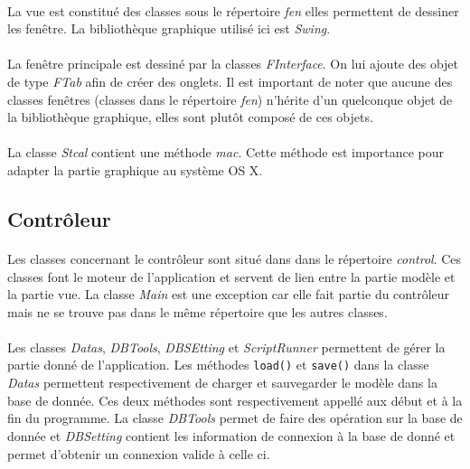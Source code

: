 \documentclass[a4paper,10pt]{report}
\begin{document}
			\paragraph*{}
			La vue est constitué des classes sous le répertoire \textit{fen} elles permettent de dessiner les fenêtre. La bibliothèque graphique utilisé ici est \textit{Swing}.

			\paragraph*{}
			La fenêtre principale est dessiné par la classes \textit{FInterface}. On lui ajoute des objet de type \textit{FTab} afin de créer des onglets. Il est important de noter que aucune des classes fenêtres (classes dans le répertoire \textit{fen}) n’hérite d'un quelconque objet de la bibliothèque graphique, elles sont plutôt composé de ces objets.

			\paragraph*{}
			La classe \textit{Stcal} contient une méthode \textit{mac}. Cette méthode est importance pour adapter la partie graphique au système OS X.

		\subsection{Contrôleur}

			\paragraph*{}
			Les classes concernant le contrôleur sont situé dans dans le répertoire \textit{control}. Ces classes font le moteur de l'application et servent de lien entre la partie modèle et la partie vue. La classe \textit{Main} est une exception car elle fait partie du contrôleur mais ne se trouve pas dans le même répertoire que les autres classes.

			\paragraph*{}
			Les classes \textit{Datas}, \textit{DBTools}, \textit{DBSEtting} et \textit{ScriptRunner} permettent de gérer la partie donné de l'application. 
			Les méthodes \texttt{load()} et \texttt{save()} dans la classe \textit{Datas} permettent respectivement de charger et sauvegarder le modèle dans la base de donnée. Ces deux méthodes sont respectivement appellé aux début et à la fin du programme.
			La classe \textit{DBTools} permet de faire des opération sur la base de donnée et \textit{DBSetting} contient les information de connexion à la base de donné et permet d'obtenir un connexion valide à celle ci.
\end{document}
